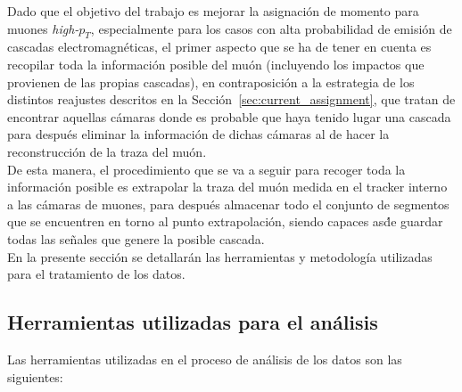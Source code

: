 
Dado que el objetivo del trabajo es mejorar la asignaci\'on de momento para muones \textit{high-$p_{T}$}, especialmente para los casos con alta probabilidad de emisi\'on de cascadas electromagn\'eticas, el primer aspecto que se ha de tener en cuenta es recopilar toda la informaci\'on posible del mu\'on (incluyendo los impactos que provienen de las propias cascadas), en contraposici\'on a la estrategia de los distintos reajustes descritos en la Secci\'on~\ref{sec:current_assignment}, que tratan de encontrar aquellas c\'amaras donde es probable que haya tenido lugar una cascada para despu\'es eliminar la informaci\'on de dichas c\'amaras al de hacer la reconstrucci\'on de la traza del mu\'on. \\
De esta manera, el procedimiento que se va a seguir para recoger toda la informaci\'on posible es extrapolar la traza del mu\'on medida en el tracker interno a las c\'amaras de muones, para despu\'es almacenar todo el conjunto de segmentos que se encuentren en torno al punto extrapolaci\'on, siendo capaces as\' de guardar todas las se\~nales que genere la posible cascada. \\

En la presente secci\'on se detallar\'an las herramientas y metodolog\'ia utilizadas para el tratamiento de los datos.


\subsection{Herramientas utilizadas para el an\'alisis}\label{sec:tools}

Las herramientas utilizadas en el proceso de an\'alisis de los datos son las siguientes:

